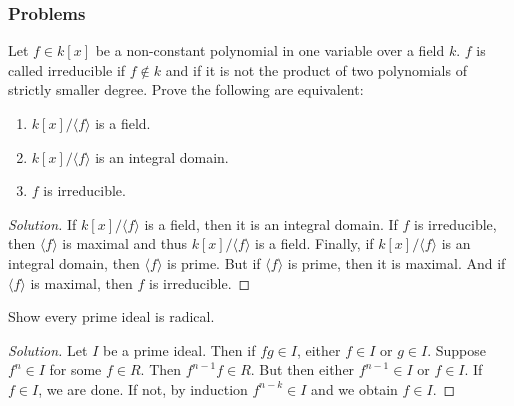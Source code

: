             \subsubsection{Problems}
                \begin{problem}
                    Let $f\in k[x]$ be a non-constant polynomial
                    in one variable over a field $k$. $f$ is called
                    irreducible if $f\notin k$ and if it is not
                    the product of two polynomials of strictly smaller
                    degree. Prove the following are equivalent:
                    \begin{enumerate}
                        \item $k[x]/\langle f\rangle$ is a field.
                        \item $k[x]/\langle f\rangle$ is an
                              integral domain.
                        \item $f$ is irreducible.
                    \end{enumerate}
                \end{problem}
                \begin{proof}[Solution]
                    If $k[x]/\langle f\rangle$ is a field,
                    then it is an integral domain. If $f$ is
                    irreducible, then $\langle f\rangle$ is
                    maximal and thus $k[x]/\langle f\rangle$ is
                    a field. Finally, if $k[x]/\langle f\rangle$ is
                    an integral domain, then $\langle f\rangle$ is
                    prime. But if $\langle f\rangle$ is prime,
                    then it is maximal. And if $\langle f\rangle$
                    is maximal, then $f$ is irreducible. 
                \end{proof}
                \begin{problem}
                    Show every prime ideal is radical.
                \end{problem}
                \begin{proof}[Solution]
                    Let $I$ be a prime ideal. Then if $fg\in I$,
                    either $f\in I$ or $g\in I$. Suppose $f^n \in I$
                    for some $f\in R$. Then $f^{n-1}f \in R$.
                    But then either $f^{n-1} \in I$ or $f\in I$.
                    If $f\in I$, we are done. If not, by induction
                    $f^{n-k} \in I$ and we obtain $f\in I$.
                \end{proof}
